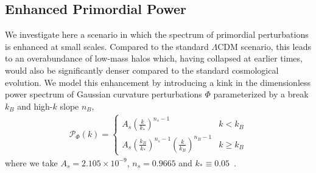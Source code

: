 \documentclass[twocolumn]{aastex63}
\newcommand{\vect}[1]{\boldsymbol{\mathbf{#1}}}
\newcommand{\dd}{\mathrm{d}}
\newcommand{\blue}[1]{\textcolor{deepblue}{\bf #1}}
\begin{document}


\subsection{Enhanced Primordial Power}

We investigate here a scenario in which the spectrum of primordial perturbations is enhanced at small scales. Compared to the standard $\Lambda$CDM scenario, this leads to an overabundance of low-mass halos which, having collapsed at earlier times, would also be significantly denser compared to the standard cosmological evolution. We model this enhancement by introducing a kink in the dimensionless power spectrum of Gaussian curvature perturbations $\Phi$ parameterized by a break $k_B$ and high-$k$ slope $n_B$,
\begin{align}
\mathcal{P}_{\Phi}(k) = \begin{cases} 
A_s \left( \frac{k}{k_*} \right)^{n_s -1} & k < k_B \\ 
A_s \left( \frac{k_B}{k_*} \right)^{n_s -1}\left( \frac{k}{k_B} \right)^{n_B -1} & k \ge k_B 
\end{cases}
\end{align}
where we take $A_s = 2.105\times10^{-9}$, $n_s=0.9665$ and $k_*\equiv0.05$~\cite{Aghanim:2018eyx}.%
\end{document}
